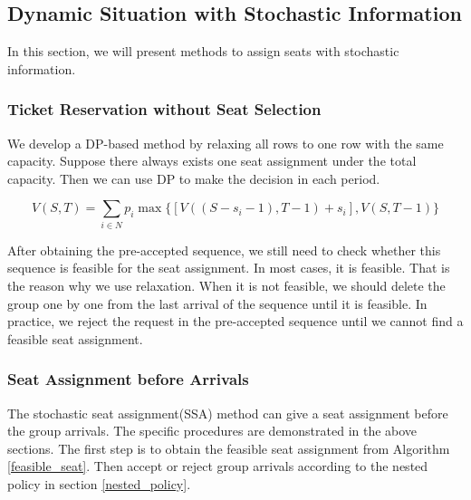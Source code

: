 \subsection{Dynamic Situation with Stochastic Information}
In this section, we will present methods to assign seats with stochastic information.


\subsubsection{Ticket Reservation without Seat Selection}
We develop a DP-based method by relaxing all rows to one row with the same capacity.
Suppose there always exists one seat assignment under the total capacity. Then we can use DP to make the decision in each period.

$$V(S,T) = \sum_{i \in N} p_i \max\{ {[V((S-s_i-1),T-1)+ s_i]}, {V(S,T-1)}\}$$

After obtaining the pre-accepted sequence, we still need to check whether this sequence is feasible for the seat assignment. In most cases, it is feasible. That is the reason why we use relaxation. When it is not feasible, we should delete the group one by one from the last arrival of the sequence until it is feasible. In practice, we reject the request in the pre-accepted sequence until we cannot find a feasible seat assignment.


\subsubsection{Seat Assignment before Arrivals}
The stochastic seat assignment(SSA) method can give a seat assignment before the group arrivals. The specific procedures are demonstrated in the above sections. The first step is to obtain the feasible seat assignment from Algorithm \ref{feasible_seat}. Then accept or reject group arrivals according to the nested policy in section \ref{nested_policy}.






